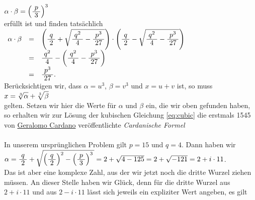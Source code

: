 $\alpha \cdot \beta = \Bigl(\bruch{p}{3}\Bigr)^3$
\\[0.2cm]
erf\"{u}llt ist und finden tats\"{a}chlich
\\[0.2cm]
\hspace*{1.3cm}
$
\begin{array}[t]{lcl}
      \alpha \cdot \beta 
& = & \left(\bruch{q}{2} + \sqrt{\bruch{q^2}{4} - \bruch{p^3}{27}}\right) \cdot
      \left(\bruch{q}{2} - \sqrt{\bruch{q^2}{4} - \bruch{p^3}{27}}\right)        \\[0.2cm]
& = & \bruch{q^2}{4} - \left(\bruch{q^2}{4} - \bruch{p^3}{27}\right)             \\[0.2cm]
& = & \bruch{p^3}{27}.                                            
\end{array}
$
\\[0.2cm]
Ber\"{u}cksichtigen wir, dass $\alpha = u^3$, $\beta = v^3$ und $x = u + v$ ist, so muss
\\[0.2cm]
\hspace*{1.3cm}
$\displaystyle x = \sqrt[3]{\alpha} + \sqrt[3]{\beta}$
\\[0.2cm]
gelten.  Setzen wir hier die Werte f\"ur $\alpha$ und $\beta$ ein, die wir oben gefunden haben,
so erhalten wir zur L\"{o}sung der kubischen Gleichung \ref{eq:cubic} die 
erstmals 1545 von \href{http://de.wikipedia.org/wiki/Gerolamo_Cardano}{Geralomo Cardano} ver\"{o}ffentlichte 
\emph{\color{blue}Cardanische Formel}
\\[0.2cm]
\hspace*{1.3cm}
\colorbox{red}{}
\\[0.2cm]
In unserem urspr\"{u}nglichen Problem gilt $p = 15$ und $q = 4$.  Dann haben wir 
\\[0.2cm]
\hspace*{1.3cm}
$\alpha = \bruch{q}{2} + \sqrt{\left(\bruch{q}{2}\right)^2 - \left(\bruch{p}{3}\right)^3\,} =
 2 + \sqrt{4 - 125} = 2 + \sqrt{-121} = 2 + i \cdot 11
$.
\\[0.2cm]
Das ist aber eine komplexe Zahl, aus der wir jetzt noch die dritte Wurzel ziehen m\"{u}ssen.
An dieser Stelle haben wir Gl\"{u}ck, denn f\"{u}r die dritte Wurzel aus $2 + i \cdot 11$ und aus 
$2 - i \cdot 11$ l\"{a}sst sich jeweils ein expliziter Wert angeben, es gilt
\\[0.2cm]
